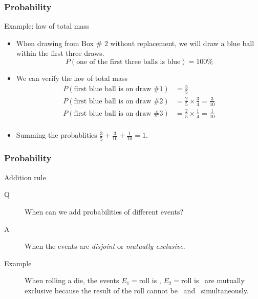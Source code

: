 \documentclass[handout]{beamer}
\begin{document}
   \begin{frame} \frametitle{Probability}

   \begin{block}
   {Example: law of total mass}
   \begin{itemize}
   \item  When drawing from Box \# 2 without replacement,
   we will draw a blue ball within the first three draws.
   $$
   P(\text{one of the first three balls is blue}) = 100 \%
   $$
   \item We can verify the law of total mass
   $$
   \begin{aligned}
   P(\text{first blue ball is on draw \# 1}) &= \frac{3}{5} \\
   P(\text{first blue ball is on draw \# 2}) &= \frac{2}{5} \times \frac{3}{4} = \frac{3}{10}  \\
   P(\text{first blue ball is on draw \# 3}) &= \frac{2}{5} \times \frac{1}{4} = \frac{1}{10}  \\
   \end{aligned}
   $$
   \item Summing the probablities $\frac{3}{5} + \frac{3}{10} +
   \frac{1}{10} = 1.$
   \end{itemize}

   \end{block}
   \end{frame}


   \begin{frame} \frametitle{Probability}

   \begin{block}
   {Addition rule}
   \begin{description}
   \item[Q] When can we add probabilities of different events?
   \item[A] When the events are {\em disjoint} or {\em mutually exclusive}.
   \item[Example] When rolling a die, the events
   $E_1=$roll is , $E_2=$roll is  \, are
   mutually exclusive
   because the result of the roll cannot be  \, and  \,
   simultaneously.
   \end{description}
   \end{block}
   \end{frame}
\end{document}
